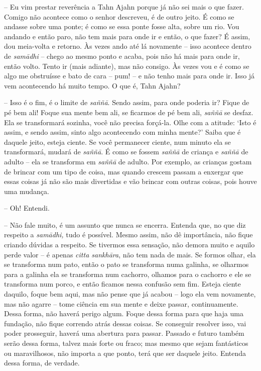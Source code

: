 -- Eu vim prestar reverência a Tahn Ajahn porque já não sei mais o que
fazer. Comigo não acontece como o senhor descreveu, é de outro jeito. É
como se andasse sobre uma ponte; é como se essa ponte fosse alta, sobre
um rio. Vou andando e então paro, não tem mais para onde ir e então, o
que fazer? É assim, dou meia-volta e retorno. Às vezes ando até lá
novamente -- isso acontece dentro de \emph{samādhi} -- chego ao mesmo
ponto e acaba, pois não há mais para onde ir, então volto. Tento ir
(mais adiante), mas não consigo. Às vezes vou e é como se algo me
obstruísse e bato de cara -- pum! -- e não tenho mais para onde ir. Isso
já vem acontecendo há muito tempo. O que é, Tahn Ajahn?

-- Isso é o fim, é o limite de \emph{saññā}. Sendo assim, para onde
poderia ir? Fique de pé bem ali! Foque sua mente bem ali, se ficarmos de
pé bem ali, \emph{saññā} se desfaz. Ela se transformará sozinha, você
não precisa forçá-la. Olhe com a atitude: `Isto é assim, e sendo assim,
sinto algo acontecendo com minha mente?' Saiba que é daquele jeito,
esteja ciente. Se você permanecer ciente, num minuto ela se
transformará, mudará de \emph{saññā}. É como se fossem \emph{saññā} de
criança e \emph{saññā} de adulto -- ela se transforma em \emph{saññā} de
adulto. Por exemplo, as crianças gostam de brincar com um tipo de coisa,
mas quando crescem passam a enxergar que essas coisas já não são mais
divertidas e vão brincar com outras coisas, pois houve uma mudança.

-- Oh! Entendi.

-- Não fale muito, é um assunto que nunca se encerra. Entenda que, no
que diz respeito a \emph{samādhi,} tudo é possível. Mesmo assim, não dê
importância, não fique criando dúvidas a respeito. Se tivermos essa
sensação, não demora muito e aquilo perde valor -- é apenas \emph{citta
sankhāra}, não tem nada de mais. Se formos olhar, ela se transforma num
pato, então o pato se transforma numa galinha, se olharmos para a
galinha ela se transforma num cachorro, olhamos para o cachorro e ele se
transforma num porco, e então ficamos nessa confusão sem fim. Esteja
ciente daquilo, foque bem aqui, mas não pense que já acabou -- logo ela
vem novamente, mas não agarre -- tome ciência em sua mente e deixe
passar, continuamente. Dessa forma, não haverá perigo algum. Foque dessa
forma para que haja uma fundação, não fique correndo atrás dessas
coisas. Se conseguir resolver isso, vai poder prosseguir, haverá uma
abertura para passar. Passado e futuro também serão dessa forma, talvez
mais forte ou fraco; mas mesmo que sejam fantásticos ou maravilhosos,
não importa a que ponto, terá que ser daquele jeito. Entenda dessa
forma, de verdade.


